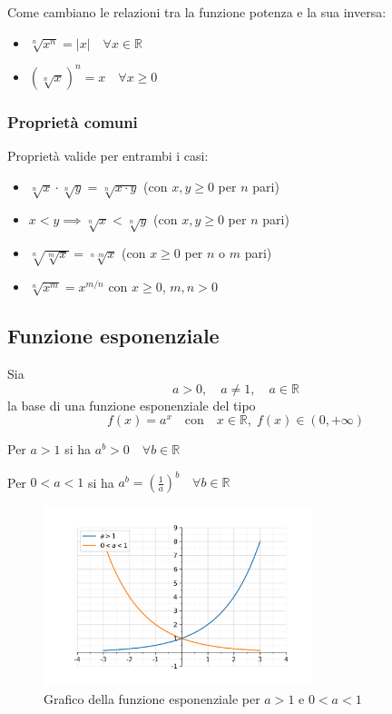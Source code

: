 \documentclass[oneside,10pt]{book} %
\begin{document}
Come cambiano le relazioni tra la funzione potenza e la sua inversa:
\begin{itemize}
\item $\sqrt[n]{x^n} = |x| \quad \forall x \in \mathbb{R}$
\item $(\sqrt[n]{x})^n = x \quad \forall x \geq 0$
\end{itemize}

\subsubsection{Proprietà comuni}
Proprietà valide per entrambi i casi:
\begin{itemize}
\item $\sqrt[n]{x} \cdot \sqrt[n]{y} = \sqrt[n]{x \cdot y}$ (con $x, y \geq 0$ per $n$ pari)
\item $x < y \implies \sqrt[n]{x} < \sqrt[n]{y}$ (con $x, y \geq 0$ per $n$ pari)
\item $\sqrt[n]{\sqrt[m]{x}} = \sqrt[n \cdot m]{x}$ (con $x \geq 0$ per $n$ o $m$ pari)
\item $\sqrt[n]{x^m} = x^{m/n}$ con $x \geq 0$, $m, n > 0$
\end{itemize}

\subsection{Funzione esponenziale}

Sia
\[
  a > 0, \quad a \neq 1, \quad a \in \mathbb{R}
\]
la base di una funzione esponenziale del tipo
\[
  f(x) = a^x \quad \text{con} \quad x \in \mathbb{R}, \; f(x) \in (0, +\infty)
\]

Per $a > 1$ si ha $a^b > 0 \quad \forall b \in \mathbb{R}$

Per $0 < a < 1$ si ha $a^b = \left(\frac{1}{a}\right)^b \quad \forall b \in \mathbb{R}$

\begin{figure}[H]
  \centering
  \includegraphics[width=0.7\textwidth]{./img/esponenziale.png}
  \caption{Grafico della funzione esponenziale per $a>1$ e $0<a<1$}
  \label{fig:funzione_esponenziale}
\end{figure}
\FloatBarrier
\end{document}
